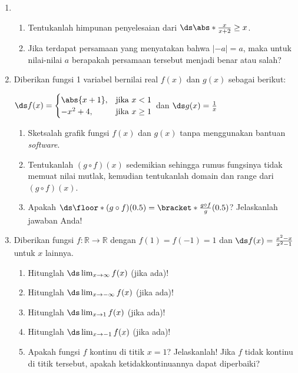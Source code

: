 \begin{enumerate}[leftmargin=*, label={\arabic*}.]
\item 
\begin{enumerate}[label={\alph*}.]
    \item Tentukanlah himpunan penyelesaian dari 
    $\ds \abs*{\frac{x}{x+2}} \geq x$.
    \item Jika terdapat persamaan yang menyatakan bahwa $|-a| = a$, 
    maka untuk nilai-nilai $a$ berapakah persamaan tersebut menjadi 
    benar atau salah?
\end{enumerate}
\item Diberikan fungsi 1 variabel bernilai real $f(x)$ dan $g(x)$ sebagai berikut:
\begin{center}
    $\ds f(x) = 
    \begin{cases}
        \abs{x+1}, &\text{jika $x < 1$}\\
        -x^{2}+4, &\text{jika $x \geq 1$}
    \end{cases}$ dan $\ds g(x) = \frac{1}{x}$
\end{center}
\begin{enumerate}[label={\alph*}.]
    \item Sketsalah grafik fungsi $f(x)$ dan $g(x)$ tanpa menggunakan bantuan
    \textit{software}.    
    \item Tentukanlah $(g \circ f)(x)$ sedemikian sehingga rumus fungsinya tidak 
    memuat nilai mutlak, kemudian tentukanlah domain dan range dari $(g \circ f)(x)$.
    \item Apakah 
    $\ds \floor*{(g \circ f)(0.5)} = \bracket*{\frac{g \circ f}{g}}(0.5)$? 
    Jelaskanlah jawaban Anda!
\end{enumerate}
\item Diberikan fungsi $f\colon \mathbb{R} \to \mathbb{R}$ dengan $f(1)=f(-1)=1$ 
dan $\ds f(x) = \frac{x^{2}-x}{x^{2}-1}$ untuk $x$ lainnya.
\begin{enumerate}[label={\alph*}.]
    \item Hitunglah $\ds \lim_{x \to \infty} f(x)$ (jika ada)! 
    \item Hitunglah $\ds \lim_{x \to -\infty} f(x)$ (jika ada)! 
    \item Hitunglah $\ds \lim_{x \to 1} f(x)$ (jika ada)! 
    \item Hitunglah $\ds \lim_{x \to -1} f(x)$ (jika ada)!
    \item Apakah fungsi $f$ kontinu di titik $x=1$? Jelaskanlah! Jika $f$ tidak 
    kontinu di titik tersebut, apakah ketidakkontinuannya dapat diperbaiki? 

\end{enumerate}
\end{enumerate}
